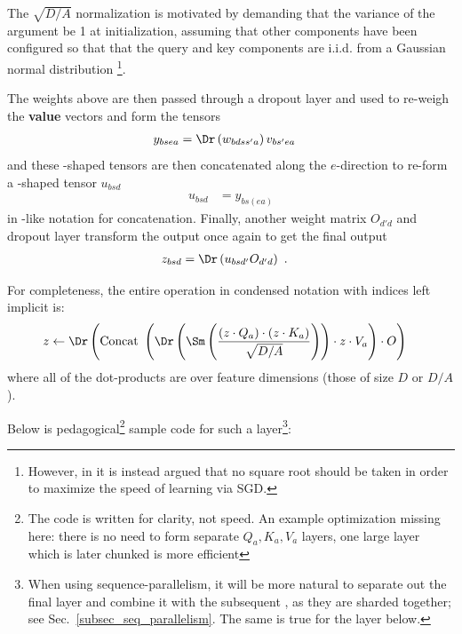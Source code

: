 \documentclass[11pt]{article}
\begin{document}
The $ \sqrt{D/A} $ normalization is motivated by demanding
that the variance of the  argument be 1 at initialization, assuming that other
components have been configured so that that the query and key components are i.i.d. from a Gaussian
normal distribution \footnote{However, in \cite{yang2022tensor} it is instead argued that no square
	root should be taken in order to maximize the speed of learning via SGD.}.

The weights above are then passed through a dropout layer and used to re-weigh the \textbf{value} vectors and form the tensors
\begin{align}
	y _{ bse a} & =\Dr  \left (w _{ bdss' a} \right ) v _{ bs'ea }
	\label{eq_reweighted_values}
\end{align}
and these -shaped tensors
are then concatenated along the $ e $-direction to re-form a -shaped
tensor $ u _{ bsd } $
\begin{align}
    u _{ bsd } & = y _{ bs(e a) }
\end{align}
in \href{https://einops.rocks/1-einops-basics/}{}-like notation for concatenation.
Finally, another weight matrix $ O _{d' d } $ and dropout layer transform the output once again to get the final
output
\begin{align}
	z _{ bsd } & = \Dr \left (u  _{ bsd' } O _{ d'd }\right )\ .
\end{align}

For completeness, the entire operation in condensed notation with indices left implicit is:
\begin{align}
	z & \leftarrow \Dr \left ({\rm Concat} \ \left ( \Dr \left (\Sm  \left ( \frac{ \left ( z \cdot Q _{ a } \right )\cdot \left ( z \cdot K _{ a } \right )}{ \sqrt{D/A} }
		\right)\right )\cdot z \cdot V _{ a } \right ) \cdot O \right ) \label{eq_causal_attn}
\end{align}
where all of the dot-products are over feature dimensions (those of size $ D $ or $ D/A $).

Below is pedagogical\footnote{The
code is written for clarity, not speed. An example optimization missing here: there is no need to
form separate $ Q _{ a },K _{ a },V _{ a} $  layers, one large layer which is later
chunked is more efficient} sample code for such a   layer\footnote{When
	using sequence-parallelism, it will be more natural to separate out the final  layer
	and combine it with the subsequent , as they are sharded together; see
	Sec.~\ref{subsec_seq_parallelism}. The same is true for the  layer below.}:
\end{document}
